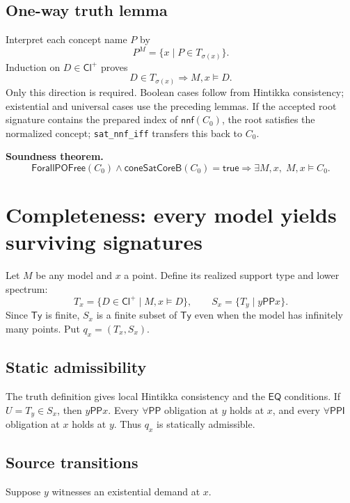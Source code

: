 \documentclass[11pt]{article}
\newcommand{\PP}{\mathsf{PP}}
\newcommand{\PPI}{\mathsf{PPI}}
\newcommand{\EQ}{\mathsf{EQ}}
\newcommand{\Ty}{\mathsf{Ty}}
\newcommand{\Cl}{\mathsf{Cl}^{+}}
\begin{document}
\subsection{One-way truth lemma}

Interpret each concept name $P$ by
\[
  P^{M}=\{x\mid P\in T_{\sigma(x)}\}.
\]
Induction on $D\in\Cl$ proves
\[
  D\in T_{\sigma(x)}\Longrightarrow M,x\models D.
\]
Only this direction is required. Boolean cases follow from Hintikka consistency;
existential and universal cases use the preceding lemmas. If the accepted root signature
contains the prepared index of $\mathsf{nnf}(C_0)$, the root satisfies the normalized
concept; \texttt{sat\_nnf\_iff} transfers this back to $C_0$.

\textbf{Soundness theorem.}
\[
  \mathsf{ForallPOFree}(C_0)\wedge
  \mathsf{coneSatCoreB}(C_0)=\mathsf{true}
  \Longrightarrow \exists M,x,\;M,x\models C_0.
\]

\section{Completeness: every model yields surviving signatures}

Let $M$ be any model and $x$ a point. Define its realized support type and lower spectrum:
\[
  T_x=\{D\in\Cl\mid M,x\models D\},
  \qquad
  S_x=\{T_y\mid y\PP x\}.
\]
Since $\Ty$ is finite, $S_x$ is a finite subset of $\Ty$ even when the model has infinitely
many points. Put $q_x=(T_x,S_x)$.

\subsection{Static admissibility}

The truth definition gives local Hintikka consistency and the $\EQ$ conditions. If
$U=T_y\in S_x$, then $y\PP x$. Every $\forall\PP$ obligation at $y$ holds at $x$, and
every $\forall\PPI$ obligation at $x$ holds at $y$. Thus $q_x$ is statically admissible.

\subsection{Source transitions}

Suppose $y$ witnesses an existential demand at $x$.
\end{document}
